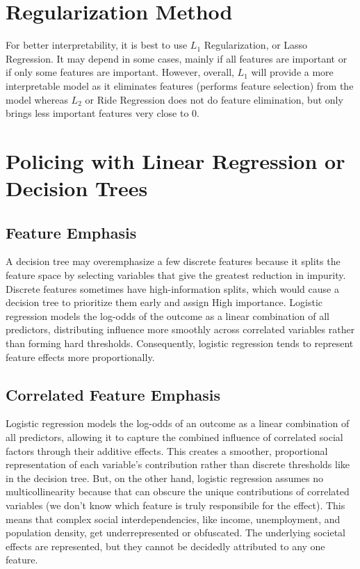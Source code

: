 \documentclass[12pt]{article}
\begin{document}
\maketitlepage

\section{Regularization Method}

For better interpretability, it is best to use $L_1$ Regularization, or Lasso Regression. It may depend in some cases, 
mainly if all features are important or if only some features are important. However, overall, $L_1$ will provide a more interpretable model as it
eliminates features (performs feature selection) from the model whereas $L_2$ or Ride Regression does not do feature elimination, but only brings less important
features very close to 0.

\section{Policing with Linear Regression or Decision Trees}

\subsection{Feature Emphasis}

A decision tree may overemphasize a few discrete features because it splits the feature space by
selecting variables that give the greatest reduction in impurity. Discrete features sometimes have
high-information splits, which would cause a decision tree to prioritize them early and assign High
importance. Logistic regression models the log-odds of the outcome as a linear combination of all
predictors, distributing influence more smoothly across correlated variables rather than
forming hard thresholds. Consequently, logistic regression tends to represent feature effects
more proportionally.

\subsection{Correlated Feature Emphasis}

Logistic regression models the log-odds of an outcome as a linear combination of all predictors, allowing
it to capture the combined influence of correlated social factors through their additive effects. This
creates a smoother, proportional representation of each variable's contribution rather than discrete thresholds
like in the decision tree. But, on the other hand, logistic regression assumes no multicollinearity because
that can obscure the unique contributions of correlated variables (we don't know which feature is truly responsibile
for the effect). This means that complex social interdependencies, like income, unemployment, and
population density, get underrepresented or obfuscated. The underlying societal effects are represented,
but they cannot be decidedly attributed to any one feature.
\end{document}
